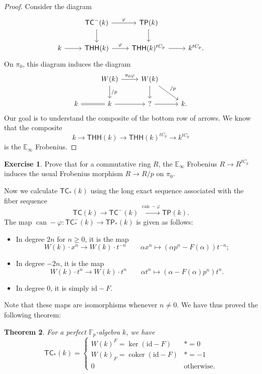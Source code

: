 \documentclass[10pt, oneside]{memoir}
\newtheorem{thm}{Theorem}[subsection]
\theoremstyle{definition}
\newtheorem{exer}[thm]{Exercise}
\theoremstyle{remark}
\theoremstyle{plain}
\theoremstyle{definition}
\theoremstyle{remark}
\newcommand{\E}{\mathbb{E}}
\newcommand{\F}{\mathbb{F}}
\newcommand{\mr}[1]{\mathrm{#1}}
\newcommand{\on}[1]{\operatorname{#1}}
\newcommand{\ms}[1]{\mathsf{#1}}
\newcommand{\1}{\mathbf{1}}
\newcommand{\2}{\mathbf{2}}
\newcommand{\3}{\mathbf{3}}
\newcommand{\THH}{\ms{THH}}
\newcommand{\TC}{\ms{TC}}
\newcommand{\TP}{\ms{TP}}
\begin{document}
\begin{proof}
    Consider the diagram
    \begin{equation*}
    \begin{tikzcd}
        & \TC^-(k) \ar{r}{\varphi} \ar{d} & \TP(k) \ar{d} \\
        k \ar{r} & \THH(k) \ar{r}{\varphi} & \THH(k)^{tC_p} \ar{r} & k^{tC_p}.
    \end{tikzcd}
    \end{equation*}
    On $\pi_0$, this diagram induces the diagram
    \begin{equation*}
    \begin{tikzcd}
        & W(k) \ar{r}{\pi_0 \varphi} \ar{d}{/p} & W(k) \ar{d} \ar{dr}{/p} \\
        k \ar[equals]{r} & k \ar{r} & ? \ar{r} & k.
    \end{tikzcd}
    \end{equation*}
    Our goal is to understand the composite of the bottom row of arrows. We know that the composite
    \[ k \to \THH(k) \to \THH(k)^{t C_p} \to k^{tC_p} \]
    is the $\E_{\infty}$ Frobenius.
\end{proof}

\begin{exer}
    Prove that for a commutative ring $R$, the $\E_{\infty}$ Frobenius $R \to R^{tC_p}$ induces the usual Frobenius morphism $R \to R/p$ on $\pi_0$.
\end{exer}

Now we calculate $\TC_*(k)$ using the long exact sequence associated with the fiber sequence
\[ \TC(k) \to \TC^-(k) \xrightarrow{\on{can} - \varphi} \TP(k). \]
The map $\on{can} - \varphi \colon \TC_*^-(k) \to \TP_*(k)$ is given as follows:
\begin{itemize}
    \item In degree $2n$ for $n \geq 0$, it is the map
    \[ W(k) \cdot x^n \to W(k) \cdot t^{-n} \qquad \alpha x^n \mapsto (\alpha p^n - F(\alpha)) t^{-n}; \]
    \item In degree $-2n$, it is the map
    \[ W(k) \cdot t^n \to W(k) \cdot t^n \qquad \alpha t^n \mapsto (\alpha - F(\alpha) p^n) t^n. \]
    \item In degree $0$, it is simply $\mr{id} - F$.
\end{itemize}
Note that these maps are isomorphisms whenever $n \neq 0$. We have thus proved the following theorem:

\begin{thm}
    For a perfect $\F_p$-algebra $k$, we have
    \[ \TC_*(k) = \begin{cases}
        W(k)^F = \ker(\mr{id}-F) & *=0 \\
        W(k)_F = \on{coker}(\mr{id}-F) & *=-1 \\
        0 & \text{otherwise}.
    \end{cases} \]
\end{thm}
\end{document}
